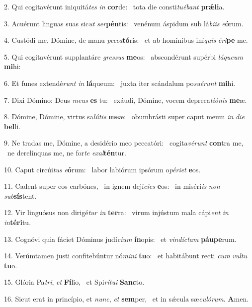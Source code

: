 2. Qui cogitavérunt iniquitá\textit{tes} \textit{in} \textbf{cor}de: \ast\  tota die consti\textit{tu}\textit{é}\textit{bant} \textbf{prǽ}\textbf{li}a.\

3. Acuérunt linguas suas sic\textit{ut} \textit{ser}\textbf{pén}tis: \ast\  venénum áspidum sub lá\textit{bi}\textit{is} \textit{e}\textbf{ó}rum.\

4. Custódi me, Dómine, de manu \textit{pec}\textit{ca}\textbf{tó}ris: \ast\  et ab homínibus iní\textit{quis} \textit{é}\textit{ri}\textbf{pe} me.\

5. Qui cogitavérunt supplantáre \textit{gres}\textit{sus} \textbf{me}os: \ast\  abscondérunt supérbi \textit{lá}\textit{que}\textit{um} \textbf{mi}hi:\

6. Et funes extendé\textit{runt} \textit{in} \textbf{lá}queum: \ast\  juxta iter scándalum po\textit{su}\textit{é}\textit{runt} \textbf{mi}hi.\

7. Dixi Dómino: Deus \textit{me}\textit{us} \textbf{es} tu: \ast\  exáudi, Dómine, vocem depreca\textit{ti}\textit{ó}\textit{nis} \textbf{me}æ.\

8. Dómine, Dómine, virtus sa\textit{lú}\textit{tis} \textbf{me}æ: \ast\  obumbrásti super caput meum \textit{in} \textit{di}\textit{e} \textbf{bel}li.\

9. Ne tradas me, Dómine, a desidério meo peccatóri: \dag\  cogita\textit{vé}\textit{runt} \textbf{con}tra me, \ast\  ne derelínquas me, ne for\textit{te} \textit{ex}\textit{al}\textbf{tén}tur.\

10. Caput circúi\textit{tus} \textit{e}\textbf{ó}rum: \ast\  labor labiórum ipsórum o\textit{pé}\textit{ri}\textit{et} \textbf{e}os.\

11. Cadent super eos carbónes, \dag\  in ignem dejí\textit{ci}\textit{es} \textbf{e}os: \ast\  in miséri\textit{is} \textit{non} \textit{sub}\textbf{sís}tent.\

12. Vir linguósus non dirigé\textit{tur} \textit{in} \textbf{ter}ra: \ast\  virum injústum mala cápi\textit{ent} \textit{in} \textit{in}\textbf{tér}\textbf{i}tu.\

13. Cognóvi quia fáciet Dóminus judí\textit{ci}\textit{um} \textbf{ín}opis: \ast\  et \textit{vin}\textit{díc}\textit{tam} \textbf{páu}\textbf{pe}rum.\

14. Verúmtamen justi confitebúntur nó\textit{mi}\textit{ni} \textbf{tu}o: \ast\  et habitábunt recti \textit{cum} \textit{vul}\textit{tu} \textbf{tu}o.\

15. Glória Pa\textit{tri}, \textit{et} \textbf{Fí}lio, \ast\  et Spi\textit{rí}\textit{tu}\textit{i} \textbf{Sanc}to.\

16. Sicut erat in princípio, et \textit{nunc}, \textit{et} \textbf{sem}per, \ast\  et in sǽcula sæ\textit{cu}\textit{ló}\textit{rum}. \textbf{A}men.\

